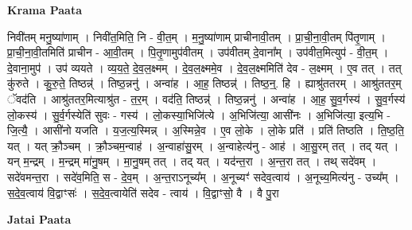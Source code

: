 \documentclass[17pt]{extarticle}
\begin{document}
\textbf{Krama Paata} \newline

निवी॑तम् मनु॒ष्या॑णाम् । निवी॑त॒मिति॒ नि - वी॒त॒म् । म॒नु॒ष्या॑णाम् प्राचीनावी॒तम् । प्रा॒ची॒ना॒वी॒तम् पि॑तृ॒णाम् । प्रा॒ची॒ना॒वी॒तमिति॑ प्राचीन - आ॒वी॒तम् । पि॒तृ॒णामुप॑वीतम् । उप॑वीतम् दे॒वाना᳚म् । उप॑वीत॒मित्युप॑ - वी॒त॒म् । दे॒वाना॒मुप॑ । उप॑ व्ययते । व्य॒य॒ते॒ दे॒व॒ल॒क्ष्मम् । दे॒व॒ल॒क्ष्ममे॒व । दे॒व॒ल॒क्ष्ममिति॑ देव - ल॒क्ष्मम् । ए॒व तत् । तत् कु॑रुते । कु॒रु॒ते॒ तिष्ठन्न्॑ । तिष्ठ॒न्ननु॑ । अन्वा॑ह । आ॒ह॒ तिष्ठन्न्॑ । तिष्ठ॒न्॒. हि । ह्याश्रु॑ततरम् । आश्रु॑ततर॒म् ॅवद॑ति । आश्रु॑ततर॒मित्याश्रु॑त - त॒र॒म् । वद॑ति॒ तिष्ठन्न्॑ । तिष्ठ॒न्ननु॑ । अन्वा॑ह । आ॒ह॒ सु॒व॒र्गस्य॑ । सु॒व॒र्गस्य॑ लो॒कस्य॑ । सु॒र्व॒र्गस्येति॑ सुवः - गस्य॑ । लो॒कस्या॒भिजि॑त्ये । अ॒भिजि॑त्या॒ आसी॑नः । अ॒भिजि॑त्या॒ इत्य॒भि - जि॒त्यै॒ । आसी॑नो यजति । य॒ज॒त्य॒स्मिन्न् । अ॒स्मिन्ने॒व । ए॒व लो॒के । लो॒के प्रति॑ । प्रति॑ तिष्ठति । ति॒ष्ठ॒ति॒ यत् । यत् क्रौ॒ञ्चम् । क्रौ॒ञ्चम॒न्वाह॑ । अ॒न्वाहा॑सु॒रम् । अ॒न्वाहेत्य॑नु - आह॑ । आ॒सु॒रम् तत् । तद् यत् । यन् म॒न्द्रम् । म॒न्द्रम् मा॑नु॒षम् । मा॒नु॒षम् तत् । तद् यत् । यद॑न्त॒रा । अ॒न्त॒रा तत् । तथ् सदे॑वम् । सदे॑वमन्त॒रा । सदे॑व॒मिति॒ स - दे॒व॒म् । अ॒न्त॒राऽनूच्य᳚म् । अ॒नूच्यꣳ॑ सदेव॒त्वाय॑ । अ॒नूच्य॒मित्य॑नु - उच्य᳚म् । स॒दे॒व॒त्वाय॑ वि॒द्वाꣳसः॑ । स॒दे॒व॒त्वायेति॑ सदेव - त्वाय॑ । वि॒द्वाꣳसो॒ वै । वै पु॒रा \newline

\textbf{Jatai Paata} \newline
\end{document}
